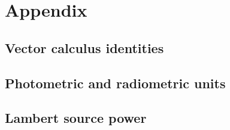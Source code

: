 \chapter*{Appendix}
\label{ch:appendix}

\section*{Vector calculus identities}

\section*{Photometric and radiometric units}

\section*{Lambert source power}